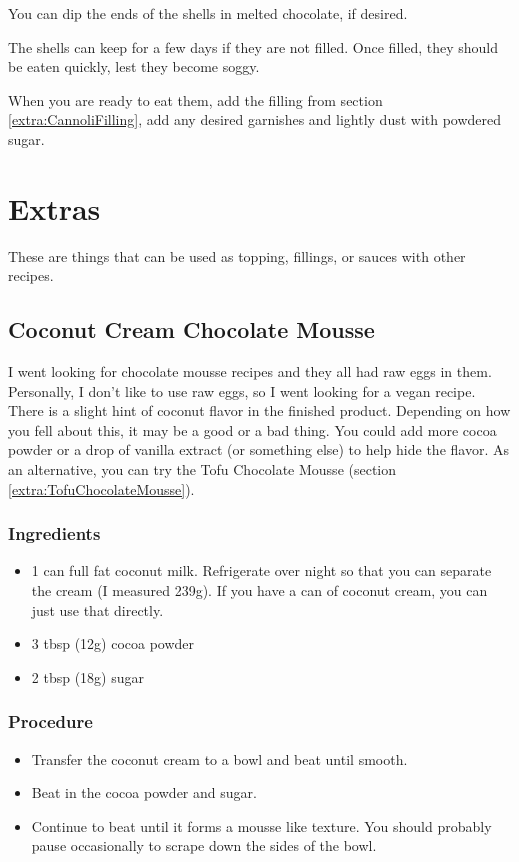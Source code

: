 \documentclass[10pt, openany]{book}
\begin{document}
You can dip the ends of the shells in melted chocolate, if desired.

The shells can keep for a few days if they are not filled.  Once filled, they should be eaten quickly, lest they become soggy.

When you are ready to eat them, add the filling from section \ref{extra:CannoliFilling}, add any desired garnishes and lightly dust with powdered sugar.


\chapter{Extras}
These are things that can be used as topping, fillings, or sauces with other recipes.

\section{Coconut Cream Chocolate Mousse}
\label{extra:CCChocolateMousse}
I went looking for chocolate mousse recipes and they all had raw eggs in them.  Personally, I don't like to use raw eggs, so I went looking for a vegan recipe.  There is a slight hint of coconut flavor in the finished product.  Depending on how you fell about this, it may be a good or a bad thing.  You could add more cocoa powder or a drop of vanilla extract (or something else) to help hide the flavor.  As an alternative, you can try the Tofu Chocolate Mousse (section \ref{extra:TofuChocolateMousse}).
\subsection{Ingredients}
\begin{itemize}
  \item 1 can full fat coconut milk.  Refrigerate over night so that you can separate the cream (I measured 239g).  If you have a can of coconut cream, you can just use that directly.
  \item 3 tbsp (12g) cocoa powder
  \item 2 tbsp (18g) sugar
\end{itemize}
\subsection{Procedure}
\begin{itemize}
  \item Transfer the coconut cream to a bowl and beat until smooth.
  \item Beat in the cocoa powder and sugar.
  \item Continue to beat until it forms a mousse like texture.  You should probably pause occasionally to scrape down the sides of the bowl.
\end{itemize}
\end{document}
